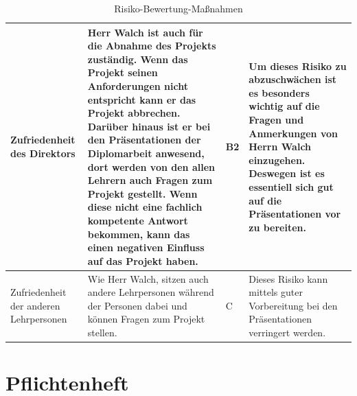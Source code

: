\begin{table}[H]
	\centering	
		\renewcommand{\arraystretch}{1.5}
	\begin{tabular}{|p{3cm}|p{5cm}|p{2cm}|p{5cm}|}
		\hline
		Zufriedenheit des Direktors & Herr Walch ist auch für die Abnahme des Projekts zuständig. Wenn das Projekt seinen Anforderungen nicht entspricht kann er das Projekt abbrechen. Darüber hinaus  ist er bei den Präsentationen der Diplomarbeit anwesend, dort werden von den allen Lehrern auch Fragen zum Projekt gestellt. Wenn diese nicht eine fachlich kompetente Antwort bekommen, kann das einen negativen Einfluss auf das Projekt haben. & B2 & Um dieses Risiko zu abzuschwächen ist es besonders wichtig auf die Fragen und Anmerkungen von Herrn Walch einzugehen. Deswegen ist es essentiell sich gut auf die Präsentationen vor zu bereiten.\\
		\hline
		Zufriedenheit der anderen Lehrpersonen & Wie Herr Walch, sitzen auch andere Lehrpersonen während der Personen dabei und können Fragen zum Projekt stellen. & C & Dieses Risiko kann mittels guter Vorbereitung bei den Präsentationen verringert werden. \\
		\hline
	\end{tabular}
		\caption{Risiko-Bewertung-Maßnahmen}
\label{Risiko}
\end{table}
\section{Pflichtenheft}
